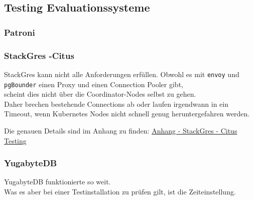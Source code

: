 
\begin{flushleft}
    \subsection{Testing Evaluationssysteme}
    \subsubsection{Patroni}
    
\end{flushleft}
\begin{flushleft}
    \subsubsection{StackGres -Citus}
    StackGres kann nicht alle Anforderungen erfüllen.
    Obwohl es mit \texttt{envoy} und \texttt{pgBounder} einen Proxy und einen Connection Pooler gibt,\\
    scheint dies nicht über die Coordinator-Nodes selbst zu gehen.\\
    Daher brechen bestehende Connections ab oder laufen irgendwann in ein Timeout, wenn \Gls{Kubernetes} Nodes nicht schnell genug heruntergefahren werden.
    
    Die genauen Details sind im Anhang zu finden:
    \hyperref[subsec:appendix_testing_stackgres_citus]{Anhang - StackGres - Citus Testing}
\end{flushleft}
\begin{flushleft}
    \subsubsection{YugabyteDB}
    YugabyteDB funktionierte so weit.\\
    
    Was es aber bei einer Testinstallation zu prüfen gilt, ist die Zeiteinstellung.
\end{flushleft}
